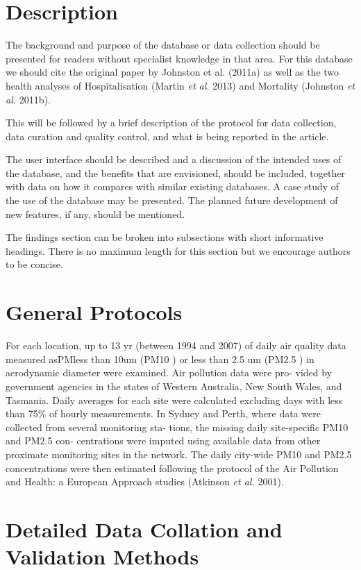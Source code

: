 \section{Description}\label{description}

The background and purpose of the database or data collection should be
presented for readers without specialist knowledge in that area. For
this database we should cite the original paper by Johnston et al.
(2011a) as well as the two health analyses of Hospitalisation (Martin
\emph{et al.} 2013) and Mortality (Johnston \emph{et al.} 2011b).

This will be followed by a brief description of the protocol for data
collection, data curation and quality control, and what is being
reported in the article.

The user interface should be described and a discussion of the intended
uses of the database, and the benefits that are envisioned, should be
included, together with data on how it compares with similar existing
databases. A case study of the use of the database may be presented. The
planned future development of new features, if any, should be mentioned.

The findings section can be broken into subsections with short
informative headings. There is no maximum length for this section but we
encourage authors to be concise.

\section{General Protocols}\label{general-protocols}

For each location, up to 13 yr (between 1994 and 2007) of daily air
quality data measured asPMless than 10um (PM10 ) or less than 2.5 um
(PM2.5 ) in aerodynamic diameter were examined. Air pollution data were
pro- vided by government agencies in the states of Western Australia,
New South Wales, and Tasmania. Daily averages for each site were
calculated excluding days with less than 75\% of hourly measurements. In
Sydney and Perth, where data were collected from several monitoring sta-
tions, the missing daily site-specific PM10 and PM2.5 con- centrations
were imputed using available data from other proximate monitoring sites
in the network. The daily city-wide PM10 and PM2.5 concentrations were
then estimated following the protocol of the Air Pollution and Health: a
European Approach studies (Atkinson \emph{et al.} 2001).

\section{Detailed Data Collation and Validation
Methods}\label{detailed-data-collation-and-validation-methods}

